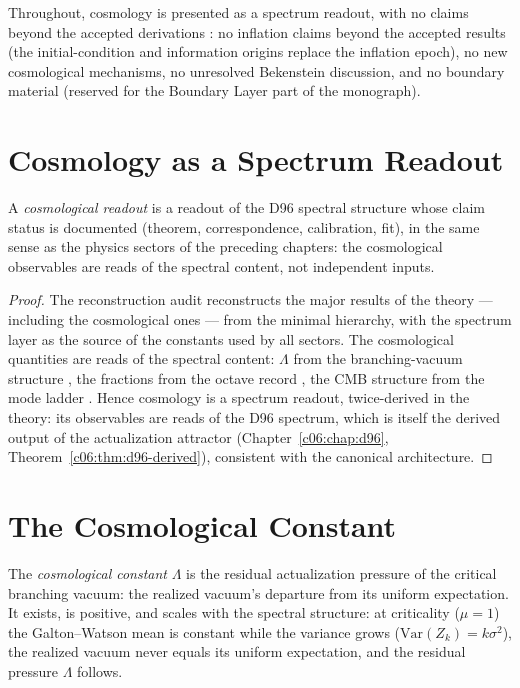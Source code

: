 Throughout, cosmology is presented as a spectrum readout, with no claims beyond the
accepted derivations \cite{c12:MONO007}: no inflation claims beyond the accepted results (the
initial-condition and information origins replace the inflation epoch), no new cosmological
mechanisms, no unresolved Bekenstein discussion, and no boundary material (reserved for the
Boundary Layer part of the monograph).

\section{Cosmology as a Spectrum Readout}
\label{c12:sec:spectrum-readout}

\begin{theorem}
\label{c12:thm:cosmo-emergent}
A \emph{cosmological readout} is a readout of the D96 spectral structure whose claim
status is documented (theorem, correspondence, calibration, fit), in the same sense as the
physics sectors of the preceding chapters: the cosmological observables are reads of the
spectral content, not independent inputs.
\end{theorem}

\begin{proof}
The reconstruction audit \cite{c12:QG296} reconstructs the major results of the theory ---
including the cosmological ones --- from the minimal hierarchy, with the spectrum layer as
the source of the constants used by all sectors. The cosmological quantities are reads of
the spectral content: $\Lambda$ from the branching-vacuum structure \cite{c12:QG230}, the
fractions from the octave record \cite{c12:QG234}, the CMB structure from the mode ladder
\cite{c12:QG237,c12:QG238}. Hence cosmology is a spectrum readout, twice-derived in the
theory: its observables are reads of the D96 spectrum, which is itself the derived output
of the actualization attractor (Chapter~\ref{c06:chap:d96},
Theorem~\ref{c06:thm:d96-derived}), consistent with the canonical architecture.
\end{proof}

\section{The Cosmological Constant}
\label{c12:sec:lambda}

\begin{theorem}
\label{c12:thm:lambda}
The \emph{cosmological constant} $\Lambda$ is the residual actualization pressure of the
critical branching vacuum: the realized vacuum's departure from its uniform expectation.
It exists, is positive, and scales with the spectral structure: at criticality ($\mu=1$)
the Galton--Watson mean is constant while the variance grows
($\mathrm{Var}(Z_k) = k\sigma^2$), the realized vacuum never equals its uniform
expectation, and the residual pressure $\Lambda$ follows.
\end{theorem}

